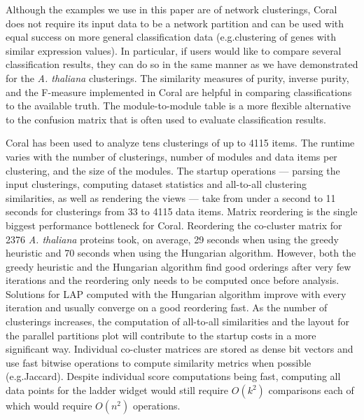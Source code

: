 \documentclass[12pt]{cmuthesis}
\newcommand\Coral{Coral\xspace}
\newcommand{\Athal}{\textit{A. thaliana}\xspace}
\begin{document}
  Although the examples we use in this paper are of network clusterings, \Coral does not require its input data to be a network partition and can be used with equal success on more general classification data (e.g.\@ clustering of genes with similar expression values). In particular, if users would like to compare several classification results, they can do so in the same manner as we have demonstrated for the \Athal clusterings. The similarity measures of purity, inverse purity, and the F-measure implemented in \Coral are helpful in comparing classifications to the available truth. The module-to-module table is a more flexible alternative to the confusion matrix that is often used to evaluate classification results.

  \Coral has been used to analyze tens clusterings of up to 4115 items. The runtime varies with the number of clusterings, number of modules and data items per clustering, and the size of the modules. The startup operations --- parsing the input clusterings, computing dataset statistics and all-to-all clustering similarities, as well as rendering the views --- take from under a second to 11 seconds for clusterings from 33 to 4115 data items. Matrix reordering is the single biggest performance bottleneck for \Coral. Reordering the co-cluster matrix for 2376 \Athal proteins took, on average, 29 seconds when using the greedy heuristic and 70 seconds when using the Hungarian algorithm. However, both the greedy heuristic and the Hungarian algorithm find good orderings after very few iterations and the reordering only needs to be computed once before analysis. Solutions for LAP computed with the Hungarian algorithm improve with every iteration and usually converge on a good reordering fast. As the number of clusterings increases, the computation of all-to-all similarities and the layout for the parallel partitions plot will contribute to the startup costs in a more significant way. Individual co-cluster matrices are stored as dense bit vectors and use fast bitwise operations to compute similarity metrics when possible (e.g.\@ Jaccard). Despite individual score computations being fast, computing all data points for the ladder widget would still require $O(k^2)$ comparisons each of which would require $O(n^2)$ operations.
\end{document}
